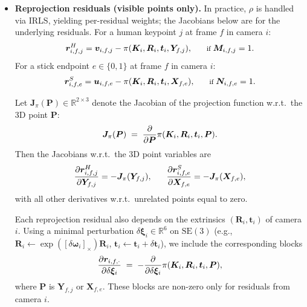 \documentclass[a4paper, 10pt, conference]{ieeeconf}      %
\newcommand{\vect}[1]{\bm{#1}}
\newcommand{\mat}[1]{\bm{#1}}
\newcommand{\proj}{\pi}
\begin{document}
\begin{itemize}
\item \textbf{Reprojection residuals (visible points only).}
In practice, $\rho$ is handled via IRLS, yielding per-residual weights; the Jacobians below are for the underlying residuals. For a human keypoint $j$ at frame $f$ in camera $i$:
\begin{equation}\footnotesize
\vect{r}_{i,f,j}^{H}
=
\vect{v}_{i,f,j}
-
\proj(\mat{K}_i,\mat{R}_i,\vect{t}_i,\vect{Y}_{f,j}),
\qquad \text{if } \mat{M}_{i,f,j}=1.
\end{equation}
For a stick endpoint $e\in\{0,1\}$ at frame $f$ in camera $i$:
\begin{equation}\footnotesize
\vect{r}_{i,f,e}^{S}
=
\vect{u}_{i,f,e}
-
\proj(\mat{K}_i,\mat{R}_i,\vect{t}_i,\vect{X}_{f,e}),
\qquad \text{if } \mat{N}_{i,f,e}=1.
\end{equation}

Let $\mat{J}_{\proj}(\vect{P}) \in \mathbb{R}^{2\times 3}$ denote the Jacobian of the projection function w.r.t.\ the 3D point $\vect{P}$:
\begin{equation}\footnotesize
\mat{J}_{\proj}(\vect{P}) \;=\; \frac{\partial}{\partial \vect{P}}
\proj(\mat{K}_i,\mat{R}_i,\vect{t}_i,\vect{P}).
\end{equation}
Then the Jacobians w.r.t.\ the 3D point variables are
\begin{equation}\footnotesize
\frac{\partial \vect{r}_{i,f,j}^{H}}{\partial \vect{Y}_{f,j}}
=
-\mat{J}_{\proj}(\vect{Y}_{f,j}),
\qquad
\frac{\partial \vect{r}_{i,f,e}^{S}}{\partial \vect{X}_{f,e}}
=
-\mat{J}_{\proj}(\vect{X}_{f,e}),
\end{equation}
with all other derivatives w.r.t.\ unrelated points equal to zero.

Each reprojection residual also depends on the extrinsics $(\mat{R}_i,\vect{t}_i)$ of camera $i$. Using a minimal perturbation $\delta \boldsymbol{\xi}_i \in \mathbb{R}^6$ on $\mathrm{SE}(3)$ (e.g., $\mat{R}_i \leftarrow \exp([\delta\boldsymbol{\omega}_i]_\times)\mat{R}_i$, $\vect{t}_i \leftarrow \vect{t}_i+\delta\vect{t}_i$), we include the corresponding blocks
\begin{equation}\footnotesize
\frac{\partial \vect{r}_{i,f,\cdot}}{\partial \delta \boldsymbol{\xi}_i}
\;=\;
-\frac{\partial}{\partial \delta \boldsymbol{\xi}_i}
\proj(\mat{K}_i,\mat{R}_i,\vect{t}_i,\vect{P}),
\end{equation}
where $\vect{P}$ is $\vect{Y}_{f,j}$ or $\vect{X}_{f,e}$. These blocks are non-zero only for residuals from camera $i$.


\end{itemize}
\end{document}
